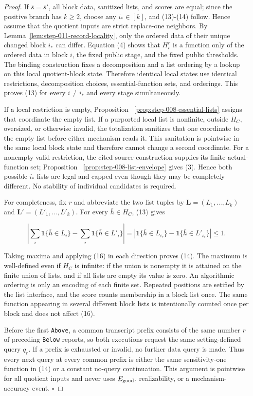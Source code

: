 \begin{proof}
If \(\bar s=\bar s'\), all block data, sanitized lists, and scores
are equal; since the positive branch has \(k\geq2\), choose any
\(i_*\in[k]\), and (13)-(14) follow. Hence assume that the quotient inputs
are strict replace-one neighbors. By
Lemma~\ref{lem:step-011-record-locality}, only the ordered data of their
unique changed block \(i_*\) can differ. Equation (4) shows that \(H_i^r\) is a
function only of the ordered data in block \(i\), the fixed public stage,
and the fixed public thresholds. The binding  construction fixes a
decomposition and a list ordering by a lookup on this local quotient-block
state. Therefore identical local states use identical restrictions,
decomposition choices, essential-function sets, and orderings. This proves
(13) for every \(i\ne i_*\) and every stage simultaneously.

If a local restriction is empty, Proposition
~\ref{prop:step-008-essential-lists} assigns that coordinate the empty
list. If a purported local list is nonfinite, outside \(H_C\), oversized, or
otherwise invalid, the  totalization sanitizes that one coordinate
to the empty list before either mechanism reads it. This sanitation is
pointwise in the same local block state and therefore cannot change a
second coordinate. For a nonempty valid restriction, the cited source
construction supplies its finite actual-function set; Proposition
~\ref{prop:step-008-list-envelope} gives (3). Hence both possible
\(i_*\)-lists are legal and capped even though they may be completely
different. No stability of individual candidates is required.

For completeness, fix \(r\) and abbreviate the two list tuples by
\(\mathbf L=(L_1,\ldots,L_k)\) and
\(\mathbf L'=(L'_1,\ldots,L'_k)\). For every \(\bar h\in H_C\), (13) gives

\[
 \left|
  \sum_i\mathbf1\{\bar h\in L_i\}
  -\sum_i\mathbf1\{\bar h\in L'_i\}
 \right|
 =|\mathbf1\{\bar h\in L_{i_*}\}
   -\mathbf1\{\bar h\in L'_{i_*}\}|
 \leq1.
\tag{16}
\]

Taking maxima and applying (16) in each direction proves (14). The maximum
is well-defined even if \(H_C\) is infinite: if the union is nonempty it is
attained on the finite union of lists, and if all lists are empty its value
is zero. An algorithmic ordering is only an encoding of each finite set.
Repeated positions are setified by the  list interface, and the
score counts membership in a block list once. The same function appearing
in several different block lists is intentionally counted once per block
and does not affect (16).

Before the first \texttt{Above}, a common transcript prefix consists of the same
number \(r\) of preceding \texttt{Below} reports, so both executions request the
same setting-defined query \(q_r\). If a prefix is exhausted or invalid, no
further data query is made. Thus every next query at every common prefix is
either the same sensitivity-one function in (14) or a constant no-query
continuation. This argument is pointwise for all quotient inputs and never
uses \(E_{\rm good}\), realizability, or a mechanism-accuracy event.
\(\square\)


\end{proof}

